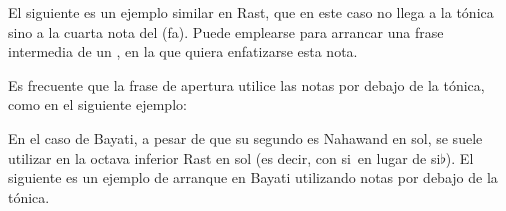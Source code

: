 
El siguiente es un ejemplo similar en \maqam Rast, que en este caso no llega a la tónica sino a la cuarta nota del \maqam (fa). Puede emplearse para arrancar una frase intermedia de un \taqsimb, en la que quiera enfatizarse esta nota.

\begin{center}
\end{center}


Es frecuente que la frase de apertura utilice las notas por debajo de la tónica, como en el siguiente ejemplo:

\begin{center}
\end{center}


En el caso de \maqam Bayati, a pesar de que su segundo \yins es \yins Nahawand en sol, se suele utilizar en la octava inferior \yins Rast en sol (es decir, con si\hflat\ en lugar de si$\flat$). El siguiente es un ejemplo de arranque en \maqam Bayati utilizando notas por debajo de la tónica.

